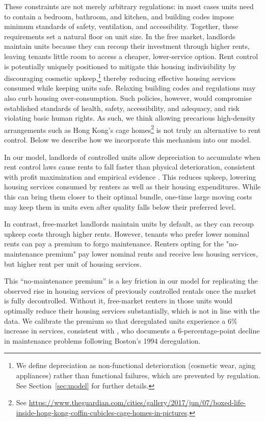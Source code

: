 \documentclass[parskip=full]{article}
\begin{document}
These constraints are not merely arbitrary regulations: in most cases units need to contain a bedroom, bathroom, and kitchen, and building codes impose minimum standards of safety, ventilation, and accessibility. Together, these requirements set a natural floor on unit size. In the free market, landlords maintain units because they can recoup their investment through higher rents, leaving tenants little room to access a cheaper, lower-service option. Rent control is potentially uniquely positioned to mitigate this housing indivisibility by discouraging cosmetic upkeep,\footnote{We define depreciation as non-functional deterioration (cosmetic wear, aging appliances) rather than functional failures, which are prevented by regulation. See Section~\ref{sec:model} for further details.} thereby reducing effective housing services consumed while keeping units safe. Relaxing building codes and regulations may also curb housing over-consumption. Such policies, however, would compromise established standards of health, safety, accessibility, and adequacy, and risk violating basic human rights. As such, we think allowing precarious high-density arrangements such as Hong Kong’s cage homes\footnote{See \url{https://www.theguardian.com/cities/gallery/2017/jun/07/boxed-life-inside-hong-kong-coffin-cubicles-cage-homes-in-pictures}.} \citep{Marsh-2016} is not truly an alternative to rent control. Below we describe how we incorporate this mechanism into our model. 

In our model, landlords of controlled units allow depreciation to accumulate when rent control laws cause rents to fall faster than physical deterioration, consistent with profit maximization and empirical evidence \citep{murray_et_al-1991}. This reduces upkeep, lowering housing services consumed by renters as well as their housing expenditures. While this can bring them closer to their optimal bundle, one-time large moving costs may keep them in units even after quality falls below their preferred level.

In contrast, free-market landlords maintain units by default, as they can recoup upkeep costs through higher rents. However, tenants who prefer lower nominal rents can pay a premium to forgo maintenance. Renters opting for the "no-maintenance premium" pay lower nominal rents and receive less housing services, but higher rent per unit of housing services. 

This “no-maintenance premium” is a key friction in our model for replicating the observed rise in housing services of previously controlled rentals once the market is fully decontrolled. Without it, free-market renters in those units would optimally reduce their housing services substantially, which is not in line with the data. We calibrate the premium so that deregulated units experience a 6\% increase in services, consistent with \citet{sims-2007}, who documents a 6-percentage-point decline in maintenance problems following Boston’s 1994 deregulation.
\end{document}
